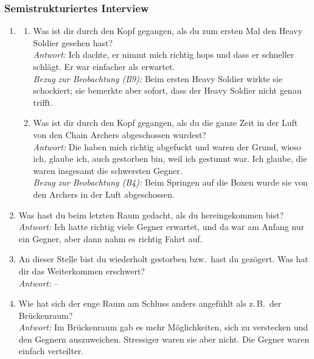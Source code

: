 \documentclass[../Main.tex]{subfiles}
\begin{document}
\subsubsection{Semistrukturiertes Interview}

\begin{enumerate}[label=\textbf{I\arabic*}, leftmargin=1.5cm, itemsep=1em]
    \item
    \begin{enumerate}[label=\alph*), itemsep=0.6em]
        \item Was ist dir durch den Kopf gegangen, als du zum ersten Mal den Heavy Soldier gesehen hast? \\
            \textit{Antwort:} Ich dachte, er nimmt mich richtig hops und dass er schneller schlägt. Er war einfacher als erwartet. \\
            \textit{Bezug zur Beobachtung (B9):} Beim ersten Heavy Soldier wirkte sie schockiert; sie bemerkte aber sofort, dass der Heavy Soldier nicht genau trifft.
        \item Was ist dir durch den Kopf gegangen, als du die ganze Zeit in der Luft von den Chain Archers abgeschossen wurdest? \\
            \textit{Antwort:} Die haben mich richtig abgefuckt und waren der Grund, wieso ich, glaube ich, auch gestorben bin, weil ich gestunnt war. Ich glaube, die waren insgesamt die schwersten Gegner. \\
            \textit{Bezug zur Beobachtung (B4):} Beim Springen auf die Boxen wurde sie von den Archers in der Luft abgeschossen.
    \end{enumerate}

\item Was hast du beim letzten Raum gedacht, als du hereingekommen bist? \\
    \textit{Antwort:} Ich hatte richtig viele Gegner erwartet, und da war am Anfang nur ein Gegner, aber dann nahm es richtig Fahrt auf.

\item An dieser Stelle bist du wiederholt gestorben bzw.\ hast du gezögert. Was hat dir das Weiterkommen erschwert? \\
    \textit{Antwort:} --

\item Wie hat sich der enge Raum am Schluss anders angefühlt als z.\,B.\ der Brückenraum? \\
    \textit{Antwort:} Im Brückenraum gab es mehr Möglichkeiten, sich zu verstecken und den Gegnern auszuweichen. Stressiger waren sie aber nicht. Die Gegner waren einfach verteilter.


\end{enumerate}
\end{document}
